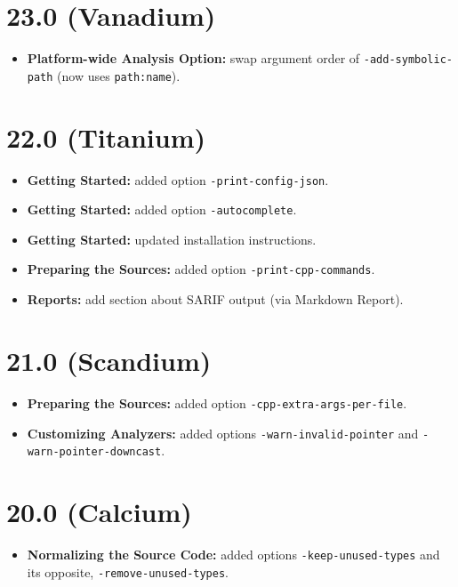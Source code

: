 \section*{23.0 (Vanadium)}

\begin{itemize}
\item \textbf{Platform-wide Analysis Option:} swap argument order of
  \texttt{-add-symbolic-path} (now uses \texttt{path:name}).
\end{itemize}

\section*{22.0 (Titanium)}

\begin{itemize}
\item \textbf{Getting Started:} added option
  \texttt{-print-config-json}.
\item \textbf{Getting Started:} added option
  \texttt{-autocomplete}.
\item \textbf{Getting Started:} updated installation instructions.
\item \textbf{Preparing the Sources:} added option
  \texttt{-print-cpp-commands}.
\item \textbf{Reports:} add section about SARIF output
  (via \textsf{Markdown Report}).
\end{itemize}

\section*{21.0 (Scandium)}

\begin{itemize}
\item \textbf{Preparing the Sources:} added option
  \texttt{-cpp-extra-args-per-file}.
\item \textbf{Customizing Analyzers:} added options
  \texttt{-warn-invalid-pointer} and \texttt{-warn-pointer-downcast}.
\end{itemize}

\section*{20.0 (Calcium)}

\begin{itemize}
\item \textbf{Normalizing the Source Code:} added options
  \texttt{-keep-unused-types} and its opposite,
  \texttt{-remove-unused-types}.
\end{itemize}

